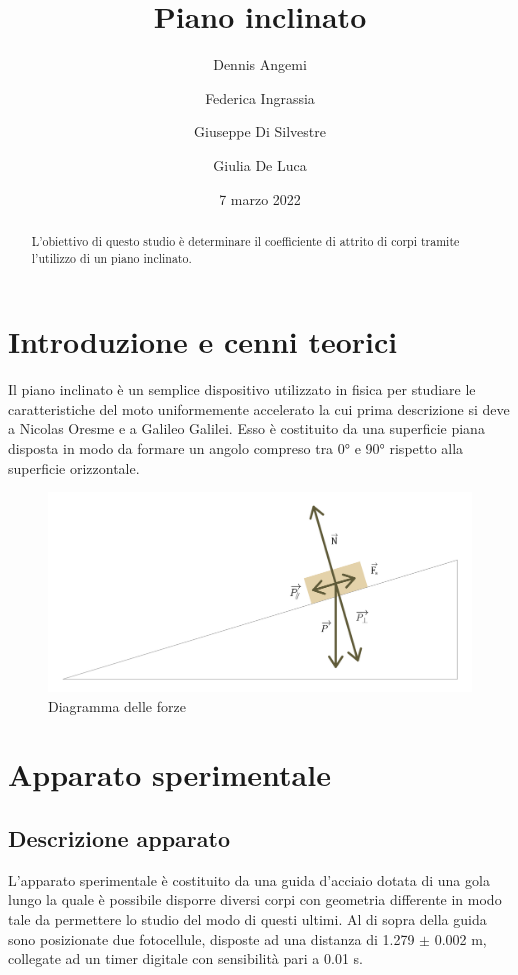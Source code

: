 \documentclass[11pt,a4paper]{article}
\title{Piano inclinato}
\author[1]{Dennis Angemi}%
\author[1]{Federica Ingrassia}%
\author[1]{Giuseppe Di Silvestre}%
\author[1]{Giulia De Luca}%
\affil[1]{Dipartimento di Fisica e Astronomia ``Ettore Majorana'' - Università degli Studi di Catania}%
\date{7 marzo 2022}
\begin{document}
\maketitle

\begin{abstract}
    L'obiettivo di questo studio è determinare il coefficiente di attrito di corpi tramite l'utilizzo di un piano inclinato.
\end{abstract}

\section{Introduzione e cenni teorici}
Il piano inclinato è un semplice dispositivo utilizzato in fisica per studiare le caratteristiche del moto uniformemente accelerato la cui prima descrizione si deve a Nicolas Oresme e a Galileo Galilei. Esso è costituito da una superficie piana disposta in modo da formare un angolo compreso tra 0° e 90° rispetto alla superficie orizzontale.

\begin{figure}[H]
\includegraphics[scale=0.15]{force-diagram.png}
\centering
\caption{Diagramma delle forze}
\label{fig:forze}
\end{figure}

\section{Apparato sperimentale}

\subsection{Descrizione apparato}
L'apparato sperimentale è costituito da una guida d'acciaio dotata di una gola lungo la quale è possibile disporre diversi corpi con geometria differente in modo tale da permettere lo studio del modo di questi ultimi. Al di sopra della guida sono posizionate due fotocellule, disposte ad una distanza di 1.279 $\pm$ 0.002 m, collegate ad un timer digitale con sensibilità pari a 0.01 s.
\end{document}
